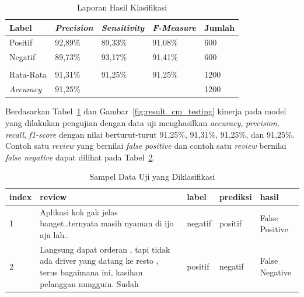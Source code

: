 \begin{table}[H]
  \centering
  \caption{Laporan Hasil Klasifikasi}
  \label{tab:laporan_hasil_klasifikasi}
  \begin{tabular}{|lllll|}
    \hline
    \multicolumn{1}{|l|}{Label}             & \multicolumn{1}{l|}{\textit{Precision}} & \multicolumn{1}{l|}{\textit{Sensitivity}} & \multicolumn{1}{l|}{\textit{F-Measure}} & Jumlah \\ \hline
    \multicolumn{1}{|l|}{Positif}           & \multicolumn{1}{l|}{92,89\%}            & \multicolumn{1}{l|}{89,33\%}              & \multicolumn{1}{l|}{91,08\%}            & 600    \\ \hline
    \multicolumn{1}{|l|}{Negatif}           & \multicolumn{1}{l|}{89,73\%}            & \multicolumn{1}{l|}{93,17\%}              & \multicolumn{1}{l|}{91,41\%}            & 600    \\ \hline
    \multicolumn{5}{|l|}{}                                                                                                                                                           \\ \hline
    \multicolumn{1}{|l|}{Rata-Rata}         & \multicolumn{1}{l|}{91,31\%}            & \multicolumn{1}{l|}{91,25\%}              & \multicolumn{1}{l|}{91,25\%}            & 1200   \\ \hline
    \multicolumn{1}{|l|}{\textit{Accuracy}} & \multicolumn{3}{l|}{91,25\%}            & 1200                                                                                         \\ \hline
  \end{tabular}
\end{table}

Berdasarkan Tabel~\ref{tab:laporan_hasil_klasifikasi} dan Gambar~\ref{fig:result_cm_testing} kinerja
pada model yang dilakukan pengujian dengan data uji menghasilkan \emph{accuracy}, \emph{precision},
\emph{recall}, \emph{f1-score} dengan nilai berturut-turut 91,25\%, 91,31\%, 91,25\%, dan 91,25\%.
Contoh satu \emph{review} yang bernilai \emph{false positive} dan contoh satu \emph{review} bernilai \emph{false negative}
dapat dilihat pada Tabel~\ref{tab:sample_result_cm_testing}.

\begin{table}[H]
  \centering
  \caption{Sampel Data Uji yang Diklasifikasi}
  \label{tab:sample_result_cm_testing}
  \begin{tabularx}{\columnwidth}{|l|X|l|l|l|}
    \hline
    index & review                                                                                                                       & label   & prediksi & hasil          \\ \hline
    1     & Aplikasi kok gak jelas banget..ternyata masih nyaman di ijo aja lah..                                                        & negatif & positif  & False Positive \\ \hline
    2     & Langsung dapat orderan , tapi tidak ada driver yang datang ke resto , terus bagaimana ini, kasihan pelanggan nungguin. Sudah & positif & negatif  & False Negative \\ \hline
  \end{tabularx}
\end{table}
\newpage

